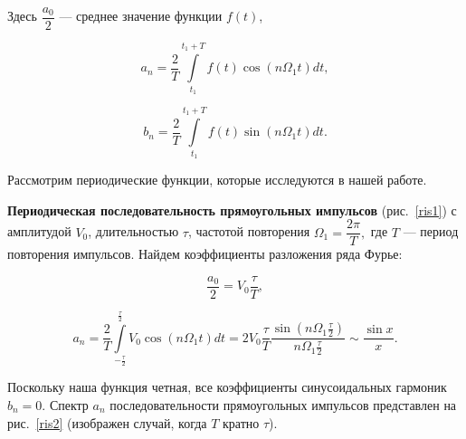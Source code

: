 \documentclass[a4paper, 12pt]{article}
\begin{document}
Здесь $\dfrac{a_{0}}{2}$ --- среднее значение функции $f(t)$,
	
$$ a_{n}=\dfrac{2}{T}\int\limits_{t_{1}}^{t_{1}+T}f(t)\cos(n \Omega_{1} t)dt, $$
	
$$ b_{n}=\dfrac{2}{T}\int\limits_{t_{1}}^{t_{1}+T}f(t)\sin(n \Omega_{1} t)dt. $$
	
Рассмотрим периодические функции, которые исследуются в нашей работе.
		
\textbf{Периодическая последовательность прямоугольных импульсов} (рис.~\ref{ris1}) с амплитудой $V_{0}$, длительностью $\tau$, частотой повторения $\Omega_{1}=\dfrac{2\pi}{T},$ где $T$ --- период повторения импульсов. Найдем коэффициенты разложения ряда Фурье:
	
$$\dfrac{a_{0}}{2}=V_{0}\dfrac{\tau}{T},$$
	
$$a_{n}=\dfrac{2}{T}\int\limits_{-\frac{\tau}{2}}^{\frac{\tau}{2}}V_{0}\cos(n \Omega_{1} t)dt=2V_{0}\dfrac{\tau}{T}\dfrac{\sin(n \Omega_{1} \frac{\tau}{2})}{n\Omega_{1}\frac{\tau}{2}} \sim \dfrac{\sin x}{x}.$$
	
Поскольку наша функция четная, все коэффициенты синусоидальных гармоник $b_{n}=0$. Спектр $a_{n}$ последовательности прямоугольных импульсов представлен на рис.~\ref{ris2} (изображен случай, когда $T$ кратно $\tau$).
		
\end{document}
